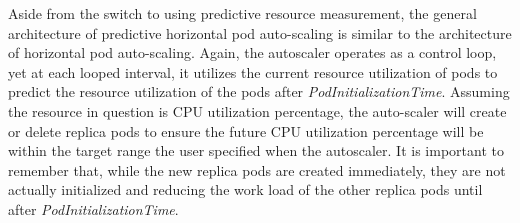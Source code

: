 Aside from the switch to using predictive resource measurement, the
general architecture of predictive horizontal pod auto-scaling is similar to the
architecture of horizontal pod auto-scaling. Again, the autoscaler operates as a
control loop, yet at each looped interval, it utilizes the current resource
utilization of pods to predict the resource utilization of the pods after
\textit{PodInitializationTime}. Assuming the resource in question is CPU
utilization percentage, the auto-scaler will create or delete replica pods
to ensure the future CPU utilization percentage will be within the target range
the user specified when the autoscaler. It is important to remember that, while
the new replica pods are created immediately, they are not actually initialized
and reducing the work load of the other replica pods until after
\textit{PodInitializationTime}.
